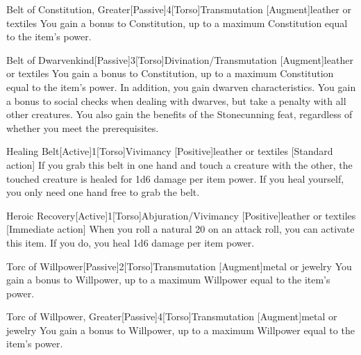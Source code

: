         \begin{magicitemdef}{Belt of Constitution, Greater}[Passive]{4}[Torso]{Transmutation [Augment]}{leather or textiles}
             You gain a  bonus to Constitution, up to a maximum Constitution equal to the item's power.
        \end{magicitemdef}

        \begin{magicitemdef}{Belt of Dwarvenkind}[Passive]{3}[Torso]{Divination/Transmutation [Augment]}{leather or textiles}
             You gain a  bonus to Constitution, up to a maximum Constitution equal to the item's power.
            In addition, you gain dwarven characteristics.
            You gain a  bonus to social checks when dealing with dwarves, but take a  penalty with all other creatures.
            You also gain the benefits of the Stonecunning feat, regardless of whether you meet the prerequisites.
        \end{magicitemdef}

        \begin{magicitemdef}{Healing Belt}[Active]{1}[Torso]{Vivimancy [Positive]}{leather or textiles}
            [Standard action] If you grab this belt in one hand and touch a creature with the other, the touched creature is healed for 1d6 damage per item power.
            If you heal yourself, you only need one hand free to grab the belt.
        \end{magicitemdef}

        \begin{magicitemdef}{Heroic Recovery}[Active]{1}[Torso]{Abjuration/Vivimancy [Positive]}{leather or textiles}
            [Immediate action] When you roll a natural 20 on an attack roll, you can activate this item. If you do, you heal 1d6 damage per item power.
        \end{magicitemdef}

        \begin{magicitemdef}{Torc of Willpower}[Passive]{2}[Torso]{Transmutation [Augment]}{metal or jewelry}
             You gain a  bonus to Willpower, up to a maximum Willpower equal to the item's power.
        \end{magicitemdef}

        \begin{magicitemdef}{Torc of Willpower, Greater}[Passive]{4}[Torso]{Transmutation [Augment]}{metal or jewelry}
             You gain a  bonus to Willpower, up to a maximum Willpower equal to the item's power.
        \end{magicitemdef}

